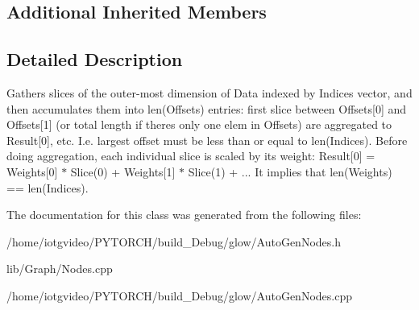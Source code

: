 \subsection*{Additional Inherited Members}


\subsection{Detailed Description}
Gathers slices of the outer-\/most dimension of Data indexed by Indices vector, and then accumulates them into len(\+Offsets) entries\+: first slice between Offsets\mbox{[}0\mbox{]} and Offsets\mbox{[}1\mbox{]} (or total length if there\textquotesingle{}s only one elem in Offsets) are aggregated to Result\mbox{[}0\mbox{]}, etc. I.\+e. largest offset must be less than or equal to len(\+Indices). Before doing aggregation, each individual slice is scaled by its weight\+: Result\mbox{[}0\mbox{]} = Weights\mbox{[}0\mbox{]} $\ast$ Slice(0) + Weights\mbox{[}1\mbox{]} $\ast$ Slice(1) + ... It implies that len(\+Weights) == len(\+Indices). 

The documentation for this class was generated from the following files\+:\begin{DoxyCompactItemize}
\item 
/home/iotgvideo/\+P\+Y\+T\+O\+R\+C\+H/build\+\_\+\+Debug/glow/Auto\+Gen\+Nodes.\+h\item 
lib/\+Graph/Nodes.\+cpp\item 
/home/iotgvideo/\+P\+Y\+T\+O\+R\+C\+H/build\+\_\+\+Debug/glow/Auto\+Gen\+Nodes.\+cpp\end{DoxyCompactItemize}
